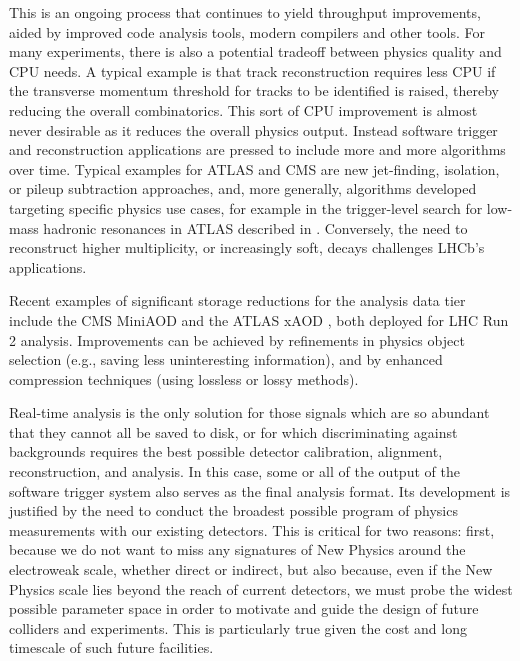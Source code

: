 This is an ongoing process that continues to yield throughput improvements, aided by improved code analysis tools, modern compilers and other tools. For many experiments, there is also a potential 
tradeoff between physics quality and CPU needs. A typical example is that track reconstruction requires less CPU if the transverse momentum threshold for tracks to be identified is raised, thereby reducing the 
overall combinatorics. This sort of CPU improvement is almost never desirable as it reduces the overall physics output. Instead software trigger and reconstruction applications are pressed to 
include more and more algorithms over time. Typical examples for ATLAS and CMS are new jet-finding, isolation, or pileup subtraction approaches, and, more generally, algorithms developed targeting 
specific physics use cases, for example in the trigger-level search for low-mass hadronic resonances in ATLAS described in \cite{Abreu2014}. Conversely, the need to reconstruct higher multiplicity, or 
increasingly soft, decays challenges LHCb’s applications.

Recent examples of significant storage reductions for the analysis data tier include the CMS MiniAOD \cite{Petrucciani2015} and the ATLAS xAOD \cite{Eifert2015}, both deployed for LHC Run 2 analysis. 
Improvements can be achieved by refinements in physics object selection (e.g., saving less uninteresting information), and by enhanced compression techniques (using lossless or lossy methods). 

Real-time analysis is the only solution for those signals which are so abundant that they cannot all be saved to disk, or for which discriminating against backgrounds requires the best possible 
detector calibration, alignment, reconstruction, and analysis. In this case, some or all of the output of the software trigger system also serves as the final analysis format. Its development is 
justified by the need to conduct the broadest possible program of physics measurements with our existing detectors. This is critical for two reasons: first, because we do not want to miss any 
signatures of New Physics around the electroweak scale, whether direct or indirect, but also because, even if the New Physics scale lies beyond the reach of current detectors, we must probe the 
widest possible parameter space in order to motivate and guide the design of future colliders and experiments. This is particularly true given the cost and long timescale of such future facilities.


